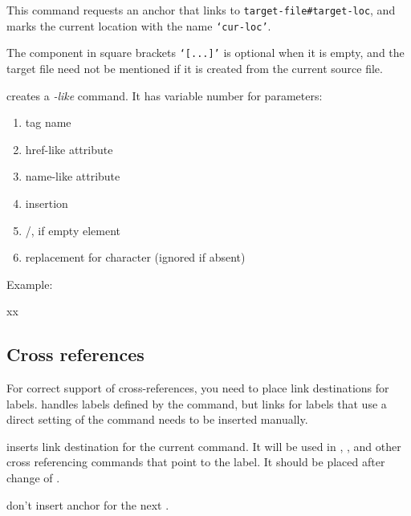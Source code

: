 This command requests an anchor that links to \verb|target-file#target-loc|, and marks the current location with the name \verb|‘cur-loc’|.

The component in square brackets \texttt{‘[...]’} is optional when it is empty, 
and the target file need not be mentioned if it is created from the current source file.


 creates a \textit{-like} command. It has variable number for parameters:

\begin{enumerate}
  \item tag name
  \item href-like attribute
  \item name-like attribute
  \item insertion
  \item /, if empty element
  \item replacement for \texcommand{#} character  (ignored if absent)
\end{enumerate}

Example:

\begin{texsource}
\LinkCommand{}
\def\jsref="#1"{href="javascript:window.open('#1')"}

xx\EndJSLink %
\EndLink       %
\end{texsource}

\subsection{Cross references}

For correct support of cross-references, you need to place link destinations for labels.
\texfourht{} handles labels defined by the  command, 
but links for labels that use a direct setting of the  command needs to be 
inserted manually.

 inserts link destination for the current  command. It will be used 
in ,  , and other cross referencing commands that point to the label.
It should be placed after change of . 

 don't insert anchor for the next .

